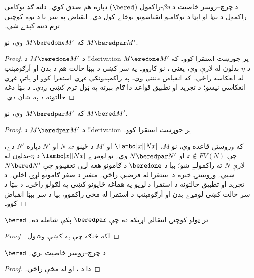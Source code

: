 \documentclass[../../../include/open-logic-section]{subfiles}
\begin{document}


د چرچ--روسر خاصيت د $\beta\eta$-راکمول ($\bered$) دپاره
هم صدق کوي۔ دلته ګډ يوګامی راکمول د بېټا او اېټا د يوګاميو انقباضونو يوځاے کول دي۔ انقباض په سر يا د يوه کوچني ترم دننه کېدے شي۔

\begin{lem}
  که $M \beredone M'$ وي، نو $M \beredpar M'$.
\end{lem}

\begin{proof} 
  د $M \beredone M'$ د !!{derivation} پر جوړښت استقرا کوو۔
  که $M \eredone M'$ د $\eta$-بدلون له لارې وي، يعنې
  ، نو
   کاروو۔ په سر کښې د بېټا حالت هم د بدن او آرګومېنټ له انعکاسه راځي۔ که انقباض دنننی وي، په راکمېدونکي غړي استقرا کوو او پاتې غړي انعکاسي نيسو؛ د تجريد او تطبيق قواعد دا ګام بېرته په ټول ترم کښې ږدي۔ د بېټا دغه حالتونه د
   په شان دي۔
\end{proof}


\begin{lem}
  که $M \beredpar M'$ وي، نو $M \bered M'$.
\end{lem}

\begin{proof} د $M \beredpar M'$ د !!{derivation} پر جوړښت استقرا کوو۔

  که وروستۍ قاعده  وي، نو $M$،
  $\lambd[x][Nx]$ او $M'$ د ځينو $x$، $N$ او $N'$ دپاره
  $N'$ دے، چې $x \notin FV(N)$ او $N \beredpar N'$ وي۔
  نو لومړے $\lambd[x][Nx]$ د $\eta$-بدلون له لارې $N$
  ته راکمولے شو؛ بيا د $\beredone$ د ګامونو هغه لړۍ
  تعقيبوو چې $N \bered N'$ ښيي۔ وروستۍ خبره د استقرا
  له فرضيې راځي۔ متغير د صفر ګامونو لړۍ اخلي۔ د تجريد او تطبيق حالتونه د استقرا د لړيو په هماغه ځايونو کښې په لګولو راځي۔ د بېټا د سر حالت کښې لومړے بدن او آرګومېنټ د استقرا له مخې راکموو، بيا د سر بېټا انقباض کوو۔
\end{proof}


\begin{lem}
  $\bered$ تر ټولو کوچنۍ انتقالي اړيکه ده چې $\beredpar$
  پکې شامله ده۔
\end{lem}

\begin{proof}
  لکه څنګه چې په  کښې وشول۔
\end{proof}

\begin{thm}
  $\bered$ د چرچ--روسر خاصيت لري۔
\end{thm}

\begin{proof}
  دا د ،  او
   له مخې راځي۔
\end{proof}
\end{document}
